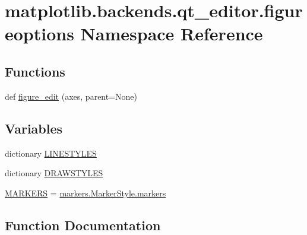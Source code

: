 \hypertarget{namespacematplotlib_1_1backends_1_1qt__editor_1_1figureoptions}{}\section{matplotlib.\+backends.\+qt\+\_\+editor.\+figureoptions Namespace Reference}
\label{namespacematplotlib_1_1backends_1_1qt__editor_1_1figureoptions}
\subsection*{Functions}
\begin{DoxyCompactItemize}
\item 
def \hyperlink{namespacematplotlib_1_1backends_1_1qt__editor_1_1figureoptions_ac2bde99588faebbd38f7fa6bf8df7c93}{figure\+\_\+edit} (axes, parent=None)
\end{DoxyCompactItemize}
\subsection*{Variables}
\begin{DoxyCompactItemize}
\item 
dictionary \hyperlink{namespacematplotlib_1_1backends_1_1qt__editor_1_1figureoptions_a2146aca90dd2f866b64eca98a9337bb6}{L\+I\+N\+E\+S\+T\+Y\+L\+ES}
\item 
dictionary \hyperlink{namespacematplotlib_1_1backends_1_1qt__editor_1_1figureoptions_a413e6e7e618aaf7973523af6a4b6500a}{D\+R\+A\+W\+S\+T\+Y\+L\+ES}
\item 
\hyperlink{namespacematplotlib_1_1backends_1_1qt__editor_1_1figureoptions_ac6ac756e054b4acae50beef88c56f4db}{M\+A\+R\+K\+E\+RS} = \hyperlink{classmatplotlib_1_1markers_1_1MarkerStyle_a0ddfb9c88144670b3551f8b36c07fab1}{markers.\+Marker\+Style.\+markers}
\end{DoxyCompactItemize}


\subsection{Function Documentation}
\mbox{\label{namespacematplotlib_1_1backends_1_1qt__editor_1_1figureoptions_ac2bde99588faebbd38f7fa6bf8df7c93}} 
